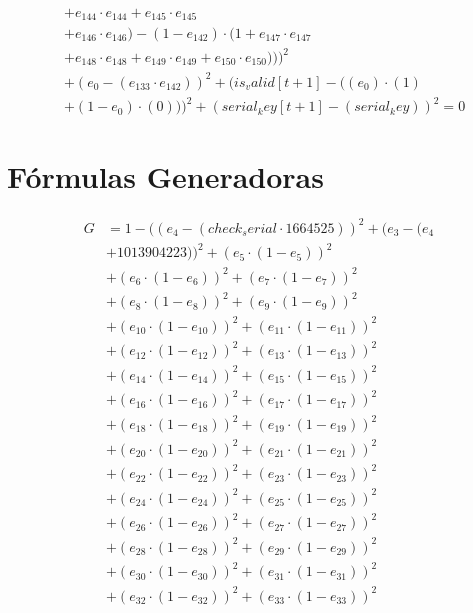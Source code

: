 \documentclass[10pt, a4paper]{article}
\begin{document}
\begin{align*}
& + e_{144} \cdot e_{144} + e_{145} \cdot e_{145} \\
& + e_{146} \cdot e_{146}) - (1 - e_{142}) \cdot (1 + e_{147} \cdot e_{147} \\
& + e_{148} \cdot e_{148} + e_{149} \cdot e_{149} + e_{150} \cdot e_{150})))^{2} \\
& + (e_{0} - (e_{133} \cdot e_{142}))^{2} + (is_valid[t+1] - ((e_{0})  \cdot  (1) \\
& + (1 - e_{0})  \cdot  (0)))^{2} + (serial_key[t+1] - (serial_key))^{2} = 0
\end{align*}\part{Fórmulas Generadoras}
\begin{small}
\begin{align*}
G &= 1 - ((e_{4} - (check_serial  \cdot  1664525))^{2} + (e_{3} - (e_{4} \\
& + 1013904223))^{2} + (e_{5} \cdot (1 - e_{5}))^{2} \\
& + (e_{6} \cdot (1 - e_{6}))^{2} + (e_{7} \cdot (1 - e_{7}))^{2} \\
& + (e_{8} \cdot (1 - e_{8}))^{2} + (e_{9} \cdot (1 - e_{9}))^{2} \\
& + (e_{10} \cdot (1 - e_{10}))^{2} + (e_{11} \cdot (1 - e_{11}))^{2} \\
& + (e_{12} \cdot (1 - e_{12}))^{2} + (e_{13} \cdot (1 - e_{13}))^{2} \\
& + (e_{14} \cdot (1 - e_{14}))^{2} + (e_{15} \cdot (1 - e_{15}))^{2} \\
& + (e_{16} \cdot (1 - e_{16}))^{2} + (e_{17} \cdot (1 - e_{17}))^{2} \\
& + (e_{18} \cdot (1 - e_{18}))^{2} + (e_{19} \cdot (1 - e_{19}))^{2} \\
& + (e_{20} \cdot (1 - e_{20}))^{2} + (e_{21} \cdot (1 - e_{21}))^{2} \\
& + (e_{22} \cdot (1 - e_{22}))^{2} + (e_{23} \cdot (1 - e_{23}))^{2} \\
& + (e_{24} \cdot (1 - e_{24}))^{2} + (e_{25} \cdot (1 - e_{25}))^{2} \\
& + (e_{26} \cdot (1 - e_{26}))^{2} + (e_{27} \cdot (1 - e_{27}))^{2} \\
& + (e_{28} \cdot (1 - e_{28}))^{2} + (e_{29} \cdot (1 - e_{29}))^{2} \\
& + (e_{30} \cdot (1 - e_{30}))^{2} + (e_{31} \cdot (1 - e_{31}))^{2} \\
& + (e_{32} \cdot (1 - e_{32}))^{2} + (e_{33} \cdot (1 - e_{33}))^{2} \\

\end{align*}
\end{small}
\end{document}
